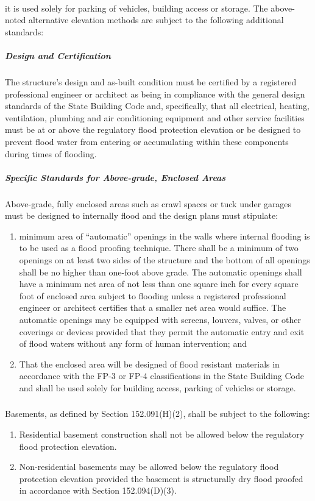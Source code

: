 \paragraph{}
it is used solely for parking of vehicles, building access or storage. The above-noted alternative elevation methods are subject to the following additional standards:
\subparagraph{Design and Certification}
The structure's design and as-built condition must be certified by a registered professional engineer or architect as being in compliance with the general design standards of the State Building Code and, specifically, that all electrical, heating, ventilation, plumbing and air conditioning equipment and other service facilities must be at or above the regulatory flood protection elevation or be designed to prevent flood water from entering or accumulating within these components during times of flooding.
\subparagraph{Specific Standards for Above-grade, Enclosed Areas}
Above-grade, fully enclosed areas such as crawl spaces or tuck under garages must be designed to internally flood and the design plans must stipulate:
\begin{enumerate}[{\indent}a)]
    \item minimum area of “automatic” openings in the walls where internal flooding is to be used as a flood proofing technique. There shall be a minimum of two openings on at least two sides of the structure and the bottom of all openings shall be no higher than one-foot above grade. The automatic openings shall have a minimum net area of not less than one square inch for every square foot of enclosed area subject to flooding unless a registered professional engineer or architect certifies that a smaller net area would suffice. The automatic openings may be equipped with screens, louvers, valves, or other coverings or devices provided that they permit the automatic entry and exit of flood waters without any form of human intervention; and
    \item That the enclosed area will be designed of flood resistant materials in accordance with the FP-3 or FP-4 classifications in the State Building Code and shall be used solely for building access, parking of vehicles or storage.
\end{enumerate}
\subsubsection{}
Basements, as defined by Section 152.091(H)(2), shall be subject to the following:
\begin{enumerate}[{\indent}a)]
    \item Residential basement construction shall not be allowed below the regulatory flood protection elevation.
    \item Non-residential basements may be allowed below the regulatory flood protection elevation provided the basement is structurally dry flood proofed in accordance with Section 152.094(D)(3).
\end{enumerate}
